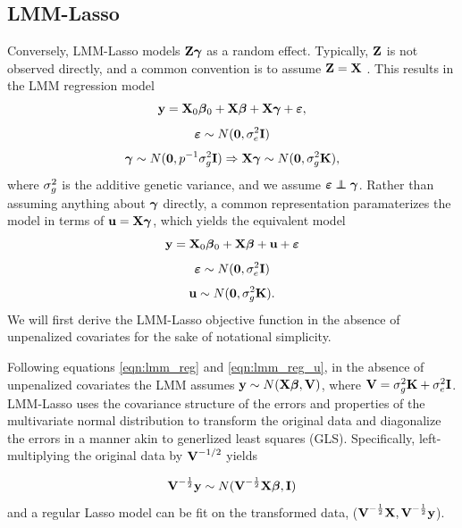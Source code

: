 \subsection{LMM-Lasso}

Conversely, LMM-Lasso models $\textbf{Z}\boldsymbol{\gamma}$ as a random effect. Typically, $\textbf{Z}$ is not observed directly, and a common convention is to assume $\textbf{Z} = \textbf{X}$ \citep{wang2018multiplex, lippert2011fast, yang2014advantages}. This results in the LMM regression model
\begin{equation}
    \label{eqn:lmm_reg}
    \textbf{y} = \textbf{X}_0\boldsymbol{\beta}{}_0 + \textbf{X}\boldsymbol{\beta}{} + \textbf{X}\boldsymbol{\gamma}+ \boldsymbol{\varepsilon}{},
\end{equation}
$$ \boldsymbol{\varepsilon}{} \sim N(\boldsymbol{0}, \sigma^2_e \textbf{I}) $$
$$ \boldsymbol{\gamma} \sim N(\boldsymbol{0}, p^{-1} \sigma^2_g \textbf{I}) \Rightarrow \textbf{X} \boldsymbol{\gamma} \sim N(\boldsymbol{0}, \sigma^2_g \textbf{K}), $$
where $\sigma^2_g$ is the additive genetic variance, and we assume $\beps \independent \bgamma$. Rather than assuming anything about $\boldsymbol{\gamma}$ directly, a common representation paramaterizes the model in terms of $\textbf{u}=\textbf{X}\boldsymbol{\gamma}$, which yields the equivalent model
\begin{equation}
    \label{eqn:lmm_reg_u}
    \textbf{y} = \textbf{X}_0\boldsymbol{\beta}{}_0 + \textbf{X}\boldsymbol{\beta}{} + \textbf{u} + \boldsymbol{\varepsilon}{}
\end{equation}
$$ \boldsymbol{\varepsilon}{} \sim N(\boldsymbol{0}, \sigma^2_e \textbf{I}) $$
$$ \textbf{u} \sim N(\boldsymbol{0}, \sigma^2_g \textbf{K}).$$
We will first derive the LMM-Lasso objective function in the absence of unpenalized covariates for the sake of notational simplicity.

Following equations \eqref{eqn:lmm_reg} and \eqref{eqn:lmm_reg_u}, in the absence of unpenalized covariates the LMM assumes $\textbf{y} \sim N(\textbf{X} \boldsymbol{\beta}{}, \textbf{V})$, where $\textbf{V} = \sigma^2_g \textbf{K} + \sigma^2_e \textbf{I}$. LMM-Lasso uses the covariance structure of the errors and properties of the multivariate normal distribution to transform the original data and diagonalize the errors in a manner akin to generlized least squares (GLS). Specifically, left-multiplying the original data by $\textbf{V}^{-1/2}$ yields 

\begin{equation}
\label{eqn:rtY_distn}
\textbf{V}^{-\frac{1}{2}}\textbf{y} \sim N(\textbf{V}^{-\frac{1}{2}} \textbf{X} \boldsymbol{\beta}{}, \textbf{I})
\end{equation}
and a regular  Lasso model can be fit on the transformed data, ($\textbf{V}^{-\frac{1}{2}}\textbf{X}, \textbf{V}^{-\frac{1}{2}}\textbf{y}$). 

